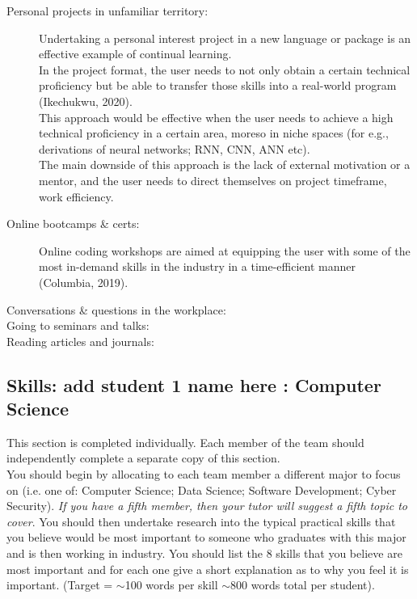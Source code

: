 \documentclass[a4paper, 11pt]{report}
\begin{document}
\begin{description}

\item [Personal projects in unfamiliar territory:] Undertaking a personal interest project in a new language or package is an effective example of continual learning. \\In the project format, the user needs to not only obtain a certain technical proficiency but be able to transfer those skills into a real-world program (Ikechukwu, 2020).
\\This approach would be effective when the user needs to achieve a high technical proficiency in a certain area, moreso in niche spaces (for e.g., derivations of neural networks; RNN, CNN, ANN etc). 
\\The main downside of this approach is the lack of external motivation or a mentor, and the user needs to direct themselves on project timeframe, work efficiency.  

\item [Online bootcamps \& certs:] Online coding workshops are aimed at equipping the user with some of the most in-demand skills in the industry in a time-efficient manner (Columbia, 2019). 

\item [Conversations \& questions in the workplace:]

\item [Going to seminars and talks:]

\item [Reading articles and journals:]


\end{description}


\subsection{Skills: add student 1 name here : Computer Science}

This section is completed individually. Each member of the team should independently complete a separate copy of this section.\\
You should begin by allocating to each team member a different major to focus on (i.e. one of: Computer Science; Data Science; Software Development; Cyber Security). \textit{If you have a fifth member, then your tutor will suggest a fifth topic to cover}. You should then undertake research into the typical practical skills that you believe would be most important to someone who graduates with this major and is then working in industry. You should list the 8 skills that you believe are most important and for each one give a short explanation as to why you feel it is important. (Target = $\sim$100 words per skill $\sim$800 words total per student).
\end{document}
